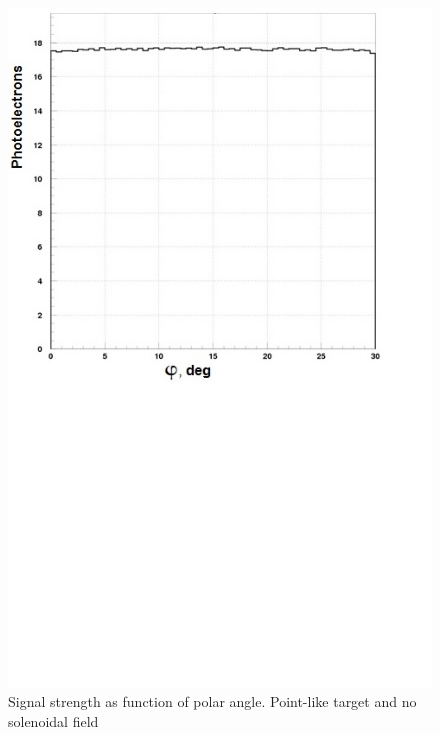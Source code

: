 \begin{figure}[!ht]
    \centering
    \includegraphics[width=1.0\linewidth,trim={0.0cm 9.4cm 0.0cm 0.0cm},clip]{images/Point_Targ_Zero_Field_Phi.jpg}
    \caption{Signal strength as function of polar angle. Point-like target and no solenoidal field}
    \label{fig:Point_Targ_Zero_Field_Phi}
\end{figure}

